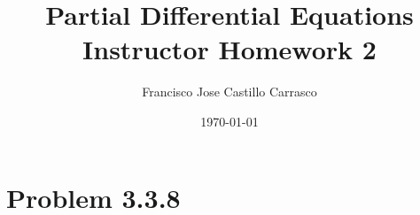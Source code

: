 




\title{Partial Differential Equations\\Instructor Homework 2}
\author{Francisco Jose Castillo Carrasco}
\date{\today}
\maketitle




\section*{Problem 3.3.8}


